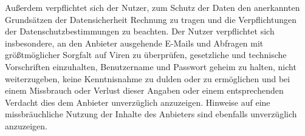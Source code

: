 Außerdem verpflichtet sich der Nutzer, zum Schutz der Daten den anerkannten Grundsätzen der Datensicherheit Rechnung zu tragen und die Verpflichtungen der Datenschutzbestimmungen zu beachten. Der Nutzer verpflichtet sich insbesondere, an den Anbieter ausgehende E-Mails und Abfragen mit größtmöglicher Sorgfalt auf Viren zu überprüfen, gesetzliche und technische Vorschriften einzuhalten, Benutzername und Passwort geheim zu halten, nicht weiterzugeben, keine Kenntnisnahme zu dulden oder zu ermöglichen und bei einem Missbrauch oder Verlust dieser Angaben oder einem entsprechenden Verdacht dies dem Anbieter unverzüglich anzuzeigen. Hinweise auf eine missbräuchliche Nutzung der Inhalte des Anbieters sind ebenfalls unverzüglich anzuzeigen.